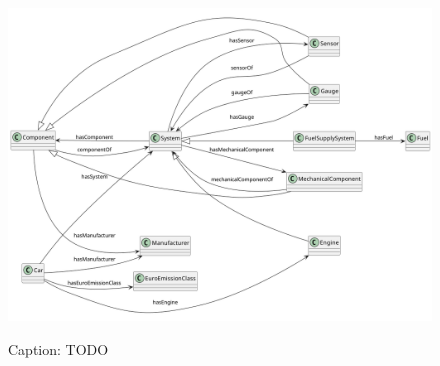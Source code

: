 \begin{figure}[H]
    \caption{Caption: TODO}
    \includegraphics[width=\textwidth]{figures/carpedia-object-properties.png}
    \label{fig:carpedia-object-properties}
\end{figure}
